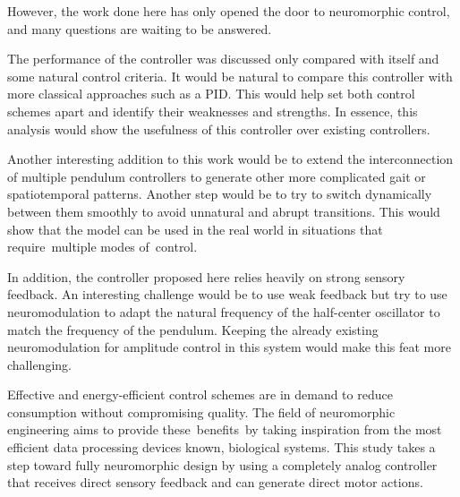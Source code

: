 
However, the work done here has only opened the door to neuromorphic control, and many questions are waiting to be answered.

The performance of the controller was discussed only compared with itself and some natural control criteria.
It would be natural to compare this controller with more classical approaches such as a PID.
This would help set both control schemes apart and identify their weaknesses and strengths.
In essence, this analysis would show the usefulness of this controller over existing controllers.

Another interesting addition to this work would be to extend the interconnection of multiple pendulum controllers to generate other more complicated gait or spatiotemporal patterns.
Another step would be to try to switch dynamically between them smoothly to avoid unnatural and abrupt transitions.
This would show that the model can be used in the real world in situations that require multiple modes of control.

In addition, the controller proposed here relies heavily on strong sensory feedback. An interesting challenge would be to use weak feedback but try to use neuromodulation to adapt the natural frequency of the half-center oscillator to match the frequency of the pendulum.
Keeping the already existing neuromodulation for amplitude control in this system would make this feat more challenging.

Effective and energy-efficient control schemes are in demand to reduce consumption without compromising quality.
The field of neuromorphic engineering aims to provide these benefits by taking inspiration from the most efficient data processing devices known, biological systems.
This study takes a step toward fully neuromorphic design by using a completely analog controller that receives direct sensory feedback and can generate direct motor actions.


%
